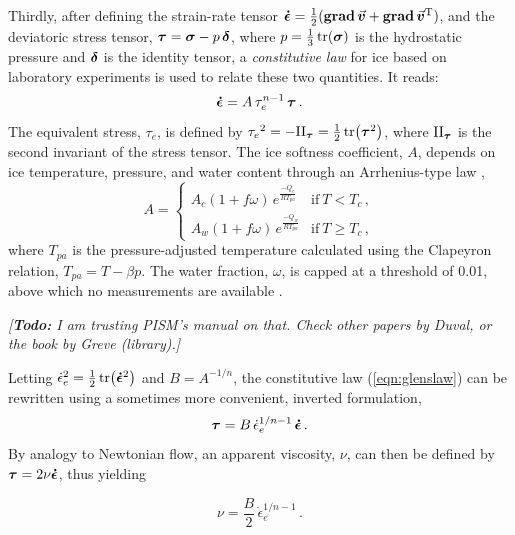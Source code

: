 \documentclass{article}
\newcommand{\todo}[1]{\emph{[\textbf{Todo:} #1]}}
\newcommand{\vect}[1]{\va*{#1}} %
\newcommand{\tens}[1]{\vb*{#1}} %
\newcommand{\tgrad}[1]{\tens{\mathrm{grad}}\,#1}    %
\newcommand{\doteps}[0]{\dot{\epsilon}} %
\newcommand{\IDT}[0]{\tens{\delta}}     %
\newcommand{\CST}[0]{\tens{\sigma}}     %
\newcommand{\DST}[0]{\tens{\tau}}       %
\newcommand{\SRT}[0]{\tens{\doteps}}    %
\newcommand{\vv}[0]{\vect{v}}           %
\begin{document}
Thirdly, after defining the strain-rate tensor
${\SRT = \frac{1}{2}(\tgrad{\vv} + \tgrad{\vv}^{\mathrm{T}})}$,
and the deviatoric stress tensor, ${\DST = \CST - p\,\IDT}$,
where $p=\frac{1}{3}\tr(\CST)$ is the hydrostatic pressure and
$\tens{\delta}$ is the identity tensor, a \emph{constitutive law} for ice
\citep{Nye.1953} based on laboratory experiments \citep{Glen.1952} is used to
relate these two quantities. It reads:
\begin{equation}
    \label{eqn:glenslaw}
    \SRT = A\,\tau_e^{n-1}\,\DST \,.
\end{equation}
The equivalent stress, $\tau_e$, is defined by
${\tau_e}^2 = -\mathrm{II}_{\DST} = \frac{1}{2} \tr(\DST^2)$,
where $\mathrm{II}_{\DST}$ is the second invariant of the stress tensor.
The ice softness coefficient, $A$, depends on ice temperature, pressure, and
water content through an Arrhenius-type law
\citep[Eqs.~63--65]{Aschwanden.etal.2012},
\begin{equation}
    A =
    \begin{cases}
        A_c (1+f\omega)\,e^\frac{-Q_c}{RT_{pa}}
            & \text{if}\ T < T_c \,, \\
        A_w (1+f\omega)\,e^\frac{-Q_w}{RT_{pa}}
            & \text{if}\ T \ge T_c \,,
    \end{cases}
\end{equation}
where $T_{pa}$ is the pressure-adjusted temperature calculated using the
Clapeyron relation, ${T_{pa} = T - \beta p}$. The water fraction, $\omega$, is
capped at a threshold of 0.01, above which no measurements are available
\citep{Lliboutry.Duval.1985}.

\todo{I am trusting PISM's manual on that. Check other papers by Duval, or
      the book by Greve (library).}

Letting ${\doteps_e}^2 = \frac{1}{2} \tr(\SRT^2)$ and $B=A^{-1/n}$, the
constitutive law (\ref{eqn:glenslaw}) can be rewritten using a sometimes more
convenient, inverted formulation,
\begin{equation}
    \label{eqn:invglenslaw}
    \DST = B\,\doteps_e^{1/n-1}\,\SRT \,.
\end{equation}
By analogy to Newtonian flow, an apparent viscosity, $\nu$, can then be defined
by $\DST = 2 \nu\SRT$, thus yielding

\begin{equation}
    \label{eqn:viscosity}
    \nu = \frac{B}{2}\,\doteps_e^{1/n-1} \,.
\end{equation}
\end{document}
